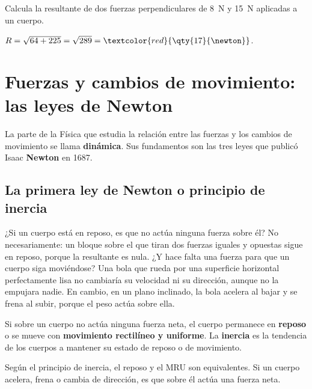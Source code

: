 \begin{exercise}
    Calcula la resultante de dos fuerzas perpendiculares de \qty{8}{\newton} y \qty{15}{\newton} aplicadas a un cuerpo.
    \begin{solu}
        \(R = \sqrt{64 + 225} = \sqrt{289} = \textcolor{red}{\qty{17}{\newton}}\).
    \end{solu}
\end{exercise}

\section{Fuerzas y cambios de movimiento: las leyes de Newton}

La parte de la Física que estudia la relación entre las fuerzas y los cambios de movimiento se llama \textbf{dinámica}. Sus fundamentos son las tres leyes que publicó Isaac \textbf{Newton} en 1687.

\subsection{La primera ley de Newton o principio de inercia}

¿Si un cuerpo está en reposo, es que no actúa ninguna fuerza sobre él? No necesariamente: un bloque sobre el que tiran dos fuerzas iguales y opuestas sigue en reposo, porque la resultante es nula. ¿Y hace falta una fuerza para que un cuerpo siga moviéndose? Una bola que rueda por una superficie horizontal perfectamente lisa no cambiaría su velocidad ni su dirección, aunque no la empujara nadie. En cambio, en un plano inclinado, la bola acelera al bajar y se frena al subir, porque el peso actúa sobre ella.

\begin{definition}
    Si sobre un cuerpo no actúa ninguna fuerza neta, el cuerpo permanece en \textbf{reposo} o se mueve con \textbf{movimiento rectilíneo y uniforme}. La \textbf{inercia} es la tendencia de los cuerpos a mantener su estado de reposo o de movimiento.
\end{definition}

Según el principio de inercia, el reposo y el MRU son equivalentes. Si un cuerpo acelera, frena o cambia de dirección, es que sobre él actúa una fuerza neta.

